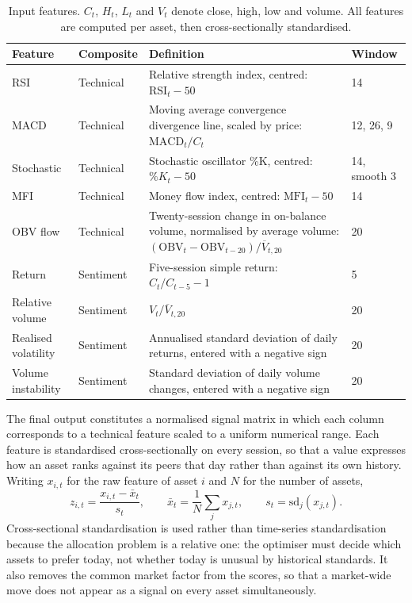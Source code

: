 \begin{table}[!ht]
\centering
\caption{Input features. $C_t$, $H_t$, $L_t$ and $V_t$ denote close, high, low and
volume. All features are computed per asset, then cross-sectionally standardised.}
\label{tab:features}
\footnotesize
\begin{tabular}{p{2.0cm}p{1.8cm}p{5.2cm}p{1.5cm}}
\hline
\textbf{Feature} & \textbf{Composite} & \textbf{Definition} & \textbf{Window} \\
\hline
RSI & Technical & Relative strength index, centred: $\mathrm{RSI}_t - 50$ & 14 \\
\hline
MACD & Technical & Moving average convergence divergence line, scaled by price: $\mathrm{MACD}_t / C_t$ & 12, 26, 9 \\
\hline
Stochastic & Technical & Stochastic oscillator \%K, centred: $\%K_t - 50$ & 14, smooth 3 \\
\hline
MFI & Technical & Money flow index, centred: $\mathrm{MFI}_t - 50$ & 14 \\
\hline
OBV flow & Technical & Twenty-session change in on-balance volume, normalised by average volume: $(\mathrm{OBV}_t - \mathrm{OBV}_{t-20}) / \overline{V}_{t,20}$ & 20 \\
\hline
Return & Sentiment & Five-session simple return: $C_t / C_{t-5} - 1$ & 5 \\
\hline
Relative volume & Sentiment & $V_t / \overline{V}_{t,20}$ & 20 \\
\hline
Realised volatility & Sentiment & Annualised standard deviation of daily returns, entered with a negative sign & 20 \\
\hline
Volume instability & Sentiment & Standard deviation of daily volume changes, entered with a negative sign & 20 \\
\hline
\end{tabular}
\end{table}

The final output constitutes a normalised signal matrix in which each column corresponds
to a technical feature scaled to a uniform numerical range. Each feature is standardised
cross-sectionally on every session, so that a value expresses how an asset ranks against
its peers that day rather than against its own history. Writing $x_{i,t}$ for the raw
feature of asset $i$ and $N$ for the number of assets,
\begin{equation}
z_{i,t} = \frac{x_{i,t} - \bar{x}_t}{s_t}, \qquad
\bar{x}_t = \frac{1}{N}\sum_{j} x_{j,t}, \qquad
s_t = \mathrm{sd}_j(x_{j,t}).
\end{equation}
Cross-sectional standardisation is used rather than time-series standardisation because
the allocation problem is a relative one: the optimiser must decide which assets to
prefer today, not whether today is unusual by historical standards. It also removes the
common market factor from the scores, so that a market-wide move does not appear as a
signal on every asset simultaneously.


